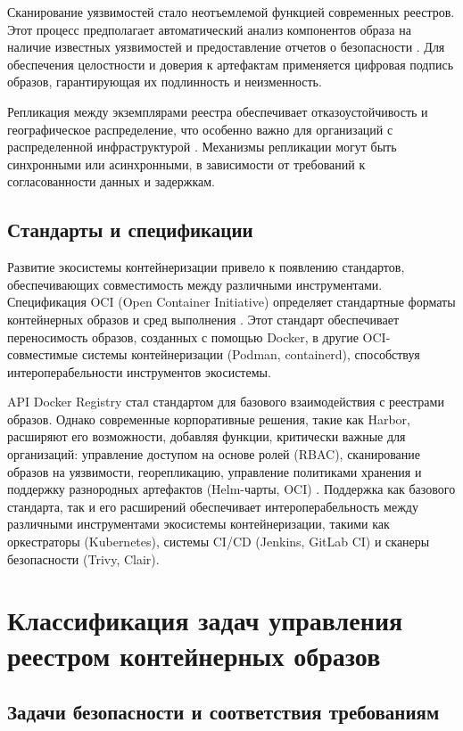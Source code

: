 Сканирование уязвимостей стало неотъемлемой функцией современных реестров. Этот процесс предполагает автоматический анализ компонентов образа на наличие известных уязвимостей и предоставление отчетов о безопасности \cite{sysdig2024}. Для обеспечения целостности и доверия к артефактам применяется цифровая подпись образов, гарантирующая их подлинность и неизменность.

Репликация между экземплярами реестра обеспечивает отказоустойчивость и географическое распределение, что особенно важно для организаций с распределенной инфраструктурой \cite{cilic2023}. Механизмы репликации могут быть синхронными или асинхронными, в зависимости от требований к согласованности данных и задержкам.

\subsection{Стандарты и спецификации}
Развитие экосистемы контейнеризации привело к появлению стандартов, обеспечивающих совместимость между различными инструментами. Спецификация OCI (Open Container Initiative) определяет стандартные форматы контейнерных образов и сред выполнения \cite{oci-spec}. Этот стандарт обеспечивает переносимость образов, созданных с помощью Docker, в другие OCI-совместимые системы контейнеризации (Podman, containerd), способствуя интероперабельности инструментов экосистемы.

API Docker Registry стал стандартом для базового взаимодействия с реестрами образов. Однако современные корпоративные решения, такие как Harbor, расширяют его возможности, добавляя функции, критически важные для организаций: управление доступом на основе ролей (RBAC), сканирование образов на уязвимости, георепликацию, управление политиками хранения и поддержку разнородных артефактов (Helm-чарты, OCI) \cite{harbor-docs}. Поддержка как базового стандарта, так и его расширений обеспечивает интероперабельность между различными инструментами экосистемы контейнеризации, такими как оркестраторы (Kubernetes), системы CI/CD (Jenkins, GitLab CI) и сканеры безопасности (Trivy, Clair).

\section{Классификация задач управления реестром контейнерных образов}
\subsection{Задачи безопасности и соответствия требованиям}

